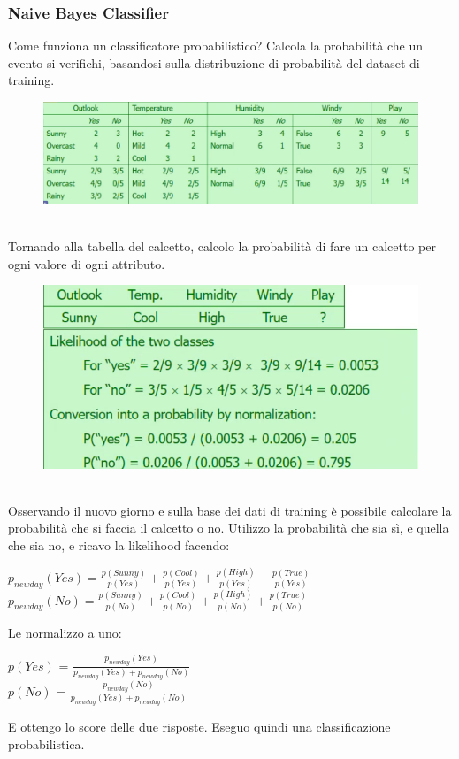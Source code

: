\subsubsection{Naive Bayes Classifier}
Come funziona un classificatore probabilistico? Calcola la probabilità che un evento si verifichi, basandosi sulla distribuzione di probabilità del dataset di training. 
\\
\begin{figure}[th]
    \centering
    \includegraphics[scale=0.5]{ML/img/prob class.png}
\end{figure}
\\
Tornando alla tabella del calcetto, calcolo la probabilità di fare un calcetto per ogni valore di ogni attributo. 
\\
\begin{figure}[th]
    \centering
    \includegraphics[scale=0.5]{ML/img/new day.png}
\end{figure}
\\
Osservando il nuovo giorno e sulla base dei dati di training è possibile calcolare la probabilità che si faccia il calcetto o no. Utilizzo la probabilità che sia sì, e quella che sia no, e ricavo la likelihood facendo:
\begin{center}
    \begin{math}
        p_{newday}(Yes) = \frac{p(Sunny)}{p(Yes)} + \frac{p(Cool)}{p(Yes)} + \frac{p(High)}{p(Yes)} + \frac{p(True)}{p(Yes)}
    \end{math}
    \\
    \begin{math}
        p_{newday}(No) = \frac{p(Sunny)}{p(No)} + \frac{p(Cool)}{p(No)} + \frac{p(High)}{p(No)} + \frac{p(True)}{p(No)} 
    \end{math}
\end{center}
Le normalizzo a uno:
\begin{center}
    $p(Yes)$ = $\frac{p_{newday}(Yes)}{p_{newday}(Yes) + p_{newday}(No)}$
    \\
    $p(No)$ = $\frac{p_{newday}(No)}{p_{newday}(Yes) + p_{newday}(No)}$
\end{center}
E ottengo lo score delle due risposte. Eseguo quindi una classificazione probabilistica.

